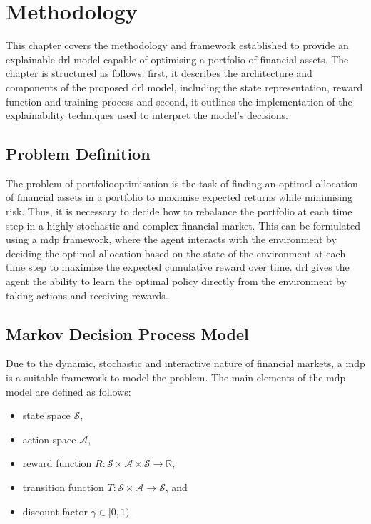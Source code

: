 \chapter{Methodology} \label{ch:methodology}

This chapter covers the methodology and framework established to provide an explainable \acrfull{drl} model capable of optimising a portfolio of financial assets. The chapter is structured as follows: first, it describes the architecture and components of the proposed \acrshort{drl} model, including the state representation, reward function and training process and second, it outlines the implementation of the explainability techniques used to interpret the model's decisions. 

\section{Problem Definition} \label{sec:problem-definition}

The problem of \gls{portfoliooptimisation} is the task of finding an optimal allocation of financial assets in a portfolio to maximise expected returns while minimising risk. Thus, it is necessary to decide how to rebalance the portfolio at each time step in a highly stochastic and complex financial market. This can be formulated using a \acrfull{mdp} framework, where the agent interacts with the environment by deciding the optimal allocation based on the state of the environment at each time step to maximise the expected cumulative reward over time. \acrfull{drl} gives the agent the ability to learn the optimal policy directly from the environment by taking actions and receiving rewards. 

\section{Markov Decision Process Model} \label{sec:mdp-model}

Due to the dynamic, stochastic and interactive nature of financial markets, a \acrlong{mdp} is a suitable framework to model the problem. The main elements of the \acrshort{mdp} model are defined as follows:
\begin{itemize}
    \item state space $\mathcal{S}$,
    \item action space $\mathcal{A}$,
    \item reward function $R: \mathcal{S} \times \mathcal{A} \times \mathcal{S} \to \mathbb{R}$,
    \item transition function $T: \mathcal{S} \times \mathcal{A} \to \mathcal{S}$, and 
    \item discount factor $\gamma \in [0,1)$.
\end{itemize}

